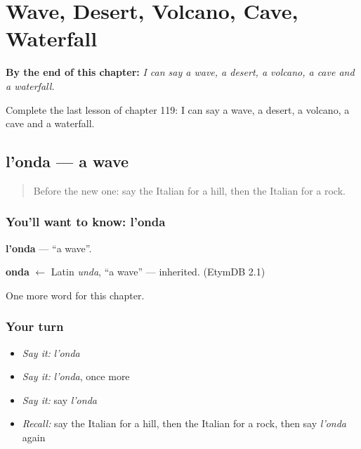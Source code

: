 
\chapter{Wave, Desert, Volcano, Cave, Waterfall}
\label{ch:it-wave-desert-volcano-cave-waterfall}

\begin{chapteropening}
\textbf{By the end of this chapter:} \emph{I can say a wave, a desert, a volcano, a cave and a waterfall.}

Complete the last lesson of chapter 119: I can say a wave, a desert, a volcano, a cave and a waterfall.
\end{chapteropening}

\section[l'onda]{l'onda — a wave}

\label{lesson:IT-C119-onda}



\begin{quote}
Before the new one: say the Italian for a hill, then the Italian for a rock.
\end{quote}

\subsection*{You'll want to know: l'onda}
\textbf{l'onda} — \textquotedblleft{}a wave\textquotedblright{}.

\begin{cousinweb}
\textbf{onda} $\leftarrow$ Latin \emph{unda}, \textquotedblleft{}a wave\textquotedblright{} — inherited. (EtymDB 2.1)
\end{cousinweb}

\begin{grammarlens}[title={What you've built}]
One more word for this chapter.
\end{grammarlens}

\subsection*{Your turn}
\begin{itemize}
\raggedright
  \item \emph{Say it:} \emph{l'onda}
  \item \emph{Say it:} \emph{l'onda}, once more
  \item \emph{Say it:} say \emph{l'onda}
  \item \emph{Recall:} say the Italian for a hill, then the Italian for a rock, then say \emph{l'onda} again
\end{itemize}

